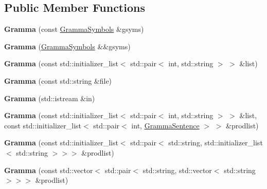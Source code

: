 \subsection*{Public Member Functions}
\begin{DoxyCompactItemize}
\item 
\mbox{\label{classx2_1_1_gramma_aaa8482a5cebd401c1d194bf9eae74622}} 
{\bfseries Gramma} (const \hyperlink{classx2_1_1_gramma_symbols}{Gramma\+Symbols} \&gsyms)
\item 
\mbox{\label{classx2_1_1_gramma_a83a39b4b3d064dd01117cab3a3ff1292}} 
{\bfseries Gramma} (\hyperlink{classx2_1_1_gramma_symbols}{Gramma\+Symbols} \&\&gsyms)
\item 
\mbox{\label{classx2_1_1_gramma_af6646cc2b56c3757361c4353bbb5d4d7}} 
{\bfseries Gramma} (const std\+::initializer\+\_\+list$<$ std\+::pair$<$ int, std\+::string $>$ $>$ \&list)
\item 
\mbox{\label{classx2_1_1_gramma_ad808555763361340d4d5ac83b21cae59}} 
{\bfseries Gramma} (const std\+::string \&file)
\item 
\mbox{\label{classx2_1_1_gramma_abc2824d9f948e57df12e62668872953b}} 
{\bfseries Gramma} (std\+::istream \&in)
\item 
\mbox{\label{classx2_1_1_gramma_a4951974a0021d5ba56b32d75d8de4e53}} 
{\bfseries Gramma} (const std\+::initializer\+\_\+list$<$ std\+::pair$<$ int, std\+::string $>$ $>$ \&list, const std\+::initializer\+\_\+list$<$ std\+::pair$<$ int, \hyperlink{classx2_1_1_gramma_sentence}{Gramma\+Sentence} $>$ $>$ \&prodlist)
\item 
\mbox{\label{classx2_1_1_gramma_aeab98669a1cc0e99274334dea8148f2a}} 
{\bfseries Gramma} (const std\+::initializer\+\_\+list$<$ std\+::pair$<$ std\+::string, std\+::initializer\+\_\+list$<$ std\+::string $>$$>$$>$ \&prodlist)
\item 
\mbox{\label{classx2_1_1_gramma_abd5c0c3cb506b2261e9c5af2d243f27b}} 
{\bfseries Gramma} (const std\+::vector$<$ std\+::pair$<$ std\+::string, std\+::vector$<$ std\+::string $>$$>$$>$ \&prodlist)

\end{DoxyCompactItemize}
